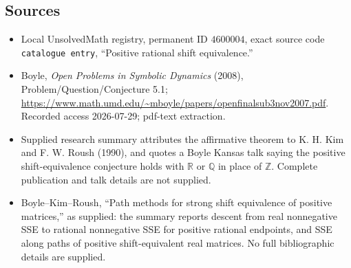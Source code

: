 \documentclass[11pt]{article}
\newcommand{\Z}{\mathbb{Z}}
\newcommand{\Q}{\mathbb{Q}}
\newcommand{\R}{\mathbb{R}}
\begin{document}
\subsection{Sources}
\begin{itemize}
\item Local UnsolvedMath registry, permanent ID \(4600004\), exact source code \texttt{catalogue entry}, ``Positive rational shift equivalence.''
\item Boyle, \emph{Open Problems in Symbolic Dynamics} (2008), Problem/Question/Conjecture 5.1; \url{https://www.math.umd.edu/~mboyle/papers/openfinalsub3nov2007.pdf}. Recorded access 2026-07-29; pdf-text extraction.
\item Supplied research summary attributes the affirmative theorem to K. H. Kim and F. W. Roush (1990), and quotes a Boyle Kansas talk saying the positive shift-equivalence conjecture holds with \(\R\) or \(\Q\) in place of \(\Z\). Complete publication and talk details are not supplied.
\item Boyle--Kim--Roush, ``Path methods for strong shift equivalence of positive matrices,'' as supplied: the summary reports descent from real nonnegative SSE to rational nonnegative SSE for positive rational endpoints, and SSE along paths of positive shift-equivalent real matrices. No full bibliographic details are supplied.
\end{itemize}
\end{document}
